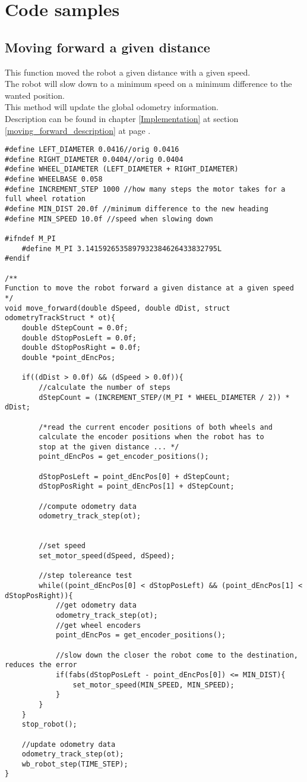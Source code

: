 \chapter{Code samples}
\label{code_samples}

\section{Moving forward a given distance}
\label{moving_forward_code}
This function moved the robot a given distance with a given speed.\\
The robot will slow down to a minimum speed on a minimum difference to the wanted position.\\
This method will update the global odometry information.\\
Description can be found in chapter \ref{Implementation} at section \ref{moving_forward_description} at page \pageref{moving_forward_description}.
\begin{lstlisting}[caption = {Moving forward}]
#define LEFT_DIAMETER 0.0416//orig 0.0416
#define RIGHT_DIAMETER 0.0404//orig 0.0404
#define WHEEL_DIAMETER (LEFT_DIAMETER + RIGHT_DIAMETER)
#define WHEELBASE 0.058 
#define INCREMENT_STEP 1000 //how many steps the motor takes for a full wheel rotation
#define MIN_DIST 20.0f //minimum difference to the new heading
#define MIN_SPEED 10.0f //speed when slowing down

#ifndef M_PI
	#define M_PI 3.1415926535897932384626433832795L
#endif

/**
Function to move the robot forward a given distance at a given speed
*/
void move_forward(double dSpeed, double dDist, struct odometryTrackStruct * ot){ 
	double dStepCount = 0.0f;
	double dStopPosLeft = 0.0f;
	double dStopPosRight = 0.0f;
	double *point_dEncPos;	
	
	if((dDist > 0.0f) && (dSpeed > 0.0f)){
		//calculate the number of steps
		dStepCount = (INCREMENT_STEP/(M_PI * WHEEL_DIAMETER / 2)) * dDist;
		
		/*read the current encoder positions of both wheels and
		calculate the encoder positions when the robot has to
		stop at the given distance ... */
		point_dEncPos = get_encoder_positions();
		
		dStopPosLeft = point_dEncPos[0] + dStepCount;
		dStopPosRight = point_dEncPos[1] + dStepCount;
		
		//compute odometry data
		odometry_track_step(ot);
		
		
		//set speed
		set_motor_speed(dSpeed, dSpeed); 
		
		//step tolereance test
		while((point_dEncPos[0] < dStopPosLeft) && (point_dEncPos[1] < dStopPosRight)){
			//get odometry data
			odometry_track_step(ot);
			//get wheel encoders
			point_dEncPos = get_encoder_positions();
			
			//slow down the closer the robot come to the destination, reduces the error
			if(fabs(dStopPosLeft - point_dEncPos[0]) <= MIN_DIST){
				set_motor_speed(MIN_SPEED, MIN_SPEED);
			}
		}
	}
	stop_robot();
	
	//update odometry data
	odometry_track_step(ot);
	wb_robot_step(TIME_STEP);
}
\end{lstlisting}

